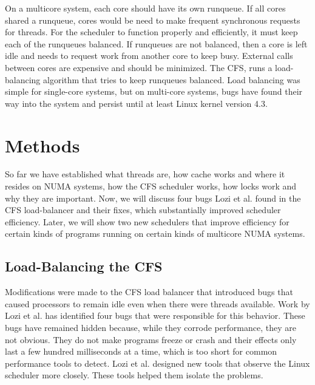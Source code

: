 \documentclass{sig-alternate}
\begin{document}
On a multicore system, each core should have its own runqueue. If all cores shared a runqueue, cores would be need to make frequent synchronous requests for threads. For the scheduler to function properly and efficiently, it must keep each of the runqueues balanced. If runqueues are not balanced, then a core is left idle and needs to request work from another core to keep busy. External calls between cores are expensive and should be minimized. The CFS, runs a load-balancing algorithm that tries to keep runqueues balanced. Load balancing was simple for single-core systems, but on multi-core systems, bugs have found their way into the system and persist until at least Linux kernel version 4.3.~\cite{Lozi:2016}


\section{Methods}
\label{sec:methods}

So far we have established what threads are, how cache works and where it resides on NUMA systems, how the CFS scheduler works, how locks work and why they are important. Now, we will discuss four bugs Lozi et al. found in the CFS load-balancer and their fixes, which substantially improved scheduler efficiency. Later, we will show two new schedulers that improve efficiency for certain kinds of programs running on certain kinds of multicore NUMA systems.

\subsection{Load-Balancing the CFS}
\label{sec:loadbalance}

Modifications were made to the CFS load balancer that introduced bugs that caused processors to remain idle even when there were threads available. Work by Lozi et al. has identified four bugs that were responsible for this behavior. These bugs have remained hidden because, while they corrode performance, they are not obvious. They do not make programs freeze or crash and their effects only last a few hundred milliseconds at a time, which is too short for common performance tools to detect. Lozi et al. designed new tools that observe the Linux scheduler more closely. These tools helped them isolate the problems.~\cite{Lozi:2016}
\end{document}

